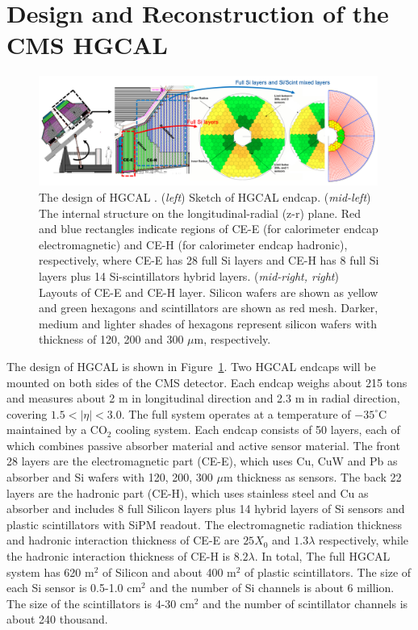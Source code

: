 \section{Design and Reconstruction of the CMS HGCAL}
\label{sec:hgcal:design}


\begin{figure}[ht]
    \centering
    \includegraphics[trim=0cm 0cm 0cm 0cm, clip,width=0.99\textwidth]{chapters/HGCal/figures/chep/hgcal2.png} 
    \caption{ The design of HGCAL \cite{Collaboration:2293646}. (\emph{left}) Sketch of HGCAL endcap. (\emph{mid-left}) The internal structure on the longitudinal-radial (z-r) plane. Red and blue rectangles indicate regions of CE-E (for calorimeter endcap electromagnetic) and CE-H (for calorimeter endcap hadronic), respectively, where CE-E has 28 full Si layers and CE-H has 8 full Si layers plus 14 Si-scintillators hybrid layers. (\emph{mid-right, right}) Layouts of CE-E and CE-H layer. Silicon wafers are shown as yellow and green hexagons and scintillators are shown as red mesh. Darker, medium and lighter shades of hexagons represent silicon wafers with thickness of 120, 200 and 300 $\mu$m, respectively.
    }
    \label{fig:hgcal}
\end{figure}

The design of HGCAL \cite{Collaboration:2293646} is shown in Figure~\ref{fig:hgcal}. Two HGCAL endcaps will be mounted on both sides of the CMS detector. Each endcap weighs about 215 tons and measures about 2 m in longitudinal direction and 2.3 m in radial direction, covering $1.5<|\eta|<3.0$. The full system operates at a temperature of $-35^\circ$C maintained by a CO$_2$ cooling system. Each endcap consists of 50 layers, each of which combines passive absorber material and active sensor material. The front 28 layers are the electromagnetic part (CE-E), which uses Cu, CuW and Pb as absorber and Si wafers with 120, 200, 300 $\mu$m thickness as sensors. The back 22 layers are the hadronic part (CE-H), which uses stainless steel and Cu as absorber and includes 8 full Silicon layers plus 14 hybrid layers of Si sensors and plastic scintillators with SiPM readout. The electromagnetic radiation thickness and hadronic interaction thickness of CE-E are $25 X_0$ and $1.3 \lambda$ respectively, while the hadronic interaction thickness of CE-H is $8.2 \lambda$. In total, The full HGCAL system has 620 m$^2$ of Silicon and about 400 m$^2$ of plastic scintillators. The size of each Si sensor is 0.5-1.0 cm$^2$ and the number of Si channels is about 6 million. The size of the scintillators is 4-30 cm$^2$ and the number of scintillator channels is about 240 thousand.


